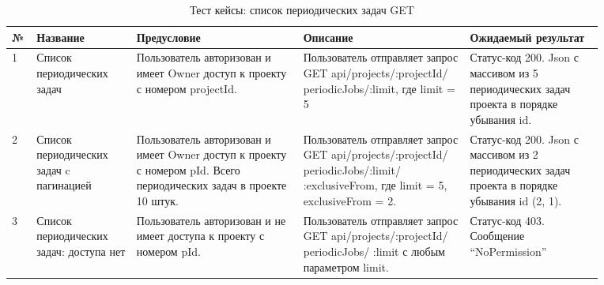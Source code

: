 \documentclass[a4paper,12pt]{article}
\begin{document}
	\begin{table}[hbt]
		\centering
		\begin{tabular}{|p{0.02\linewidth}|p{0.15\linewidth}|p{0.25\linewidth}|p{0.25\linewidth}|p{0.2\linewidth}|} 
			\hline
			\textbf{№} & \textbf{Название} & \textbf{Предусловие} & \textbf{Описание} & \textbf{Ожидаемый результат} \\ \hline
			1 & Список периодических задач & Пользователь авторизован и имеет Owner доступ к проекту с номером projectId.  &  Пользователь отправляет запрос GET api/projects/:projectId/  periodicJobs/:limit, где limit = 5 & Статус-код 200. Json с массивом из 5 периодических задач проекта в порядке убывания id. \\ \hline
			2 & Список периодических задач c пагинацией & Пользователь авторизован и имеет Owner доступ к проекту с номером pId. Всего периодических задач в проекте 10 штук.  & Пользователь отправляет запрос GET api/projects/:projectId/  periodicJobs/:limit/ :exclusiveFrom, где limit = 5, exclusiveFrom = 2. & Статус-код 200. Json с массивом из 2 периодических задач проекта в порядке убывания id (2, 1). \\ \hline
			3 & Список периодических задач: доступа нет & Пользователь авторизован и не имеет доступа к проекту с номером pId. & Пользователь отправляет запрос GET api/projects/:projectId/ periodicJobs/ :limit с любым параметром limit. & Статус-код 403. Сообщение “NoPermission” \\ \hline
			\end{tabular}
	\caption{Тест кейсы: список периодических задач GET}
	\end{table} 
	
\end{document}
